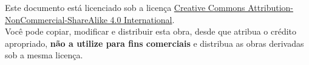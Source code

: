 \newpage
\pagestyle{plain}
\begin{center}
    {\small Este documento está licenciado sob a licença \href{https://creativecommons.org/licenses/by-nc-sa/4.0/}{Creative Commons Attribution-NonCommercial-ShareAlike 4.0 International}.\\
    Você pode copiar, modificar e distribuir esta obra, desde que atribua o crédito apropriado, \textbf{não a utilize para fins comerciais} e distribua as obras derivadas sob a mesma licença.}
\end{center}